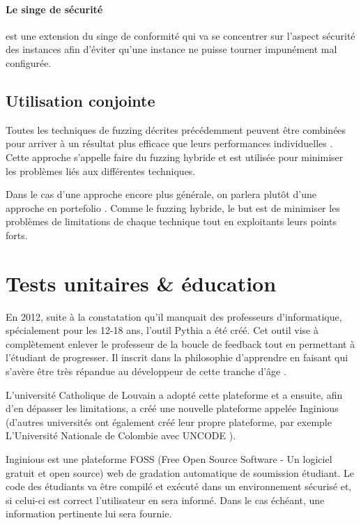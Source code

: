 \documentclass[a4paper]{report}
\begin{document}
\paragraph{Le singe de sécurité} est une extension du singe de conformité qui va se concentrer sur l'aspect sécurité des instances afin d'éviter qu'une instance ne puisse tourner impunément mal configurée.

\fi

\subsection{Utilisation conjointe}

Toutes les techniques de fuzzing décrites précédemment peuvent être combinées pour arriver à un résultat plus efficace que leurs performances individuelles \cite{Godefroid2020}.
Cette approche s'appelle faire du fuzzing hybride et est utilisée pour minimiser les problèmes liés aux différentes techniques. 


Dans le cas d'une approche encore plus générale, on parlera plutôt d'une approche en portefolio \cite{Godefroid2020}.
Comme le fuzzing hybride, le but est de minimiser les problèmes de limitations de chaque technique tout en exploitants leurs points forts.

\section{Tests unitaires \& éducation}

En 2012, suite à la constatation qu'il manquait des professeurs d'informatique, spécialement pour les 12-18 ans, l'outil Pythia a été créé.
Cet outil vise à complètement enlever le professeur de la boucle de feedback tout en permettant à l'étudiant de progresser. Il inscrit dans la philosophie d'apprendre en faisant qui s'avère être très répandue au développeur de cette tranche d'âge \cite{combefis2012teaching}.

L'université Catholique de Louvain a adopté cette plateforme et a ensuite, afin d'en dépasser les limitations, a créé une nouvelle plateforme appelée Inginious (d'autres universités ont également créé leur propre plateforme, par exemple L'Université Nationale de Colombie avec UNCODE \cite{restrepo2018uncode}).

Inginious est une plateforme FOSS (Free Open Source Software - Un logiciel gratuit et open source) web de gradation automatique de soumission étudiant.
Le code des étudiants va être compilé et exécuté dans un environnement sécurisé et, si celui-ci est correct l'utilisateur en sera informé.
Dans le cas échéant, une information pertinente lui sera fournie.
\end{document}

